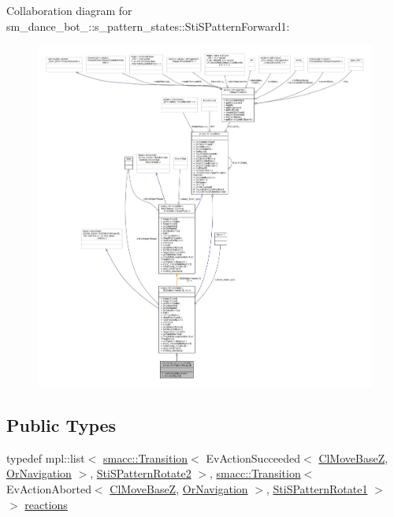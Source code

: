 Collaboration diagram for sm\+\_\+dance\+\_\+bot\+\_\+:\+:s\+\_\+pattern\+\_\+states\+:\+:Sti\+S\+Pattern\+Forward1\+:
\nopagebreak
\begin{figure}[H]
\begin{center}
\leavevmode
\includegraphics[width=350pt]{structsm__dance__bot__3_1_1s__pattern__states_1_1StiSPatternForward1__coll__graph}
\end{center}
\end{figure}
\subsection*{Public Types}
\begin{DoxyCompactItemize}
\item 
typedef mpl\+::list$<$ \hyperlink{classsmacc_1_1Transition}{smacc\+::\+Transition}$<$ Ev\+Action\+Succeeded$<$ \hyperlink{classmove__base__z__client_1_1ClMoveBaseZ}{Cl\+Move\+BaseZ}, \hyperlink{classsm__dance__bot__3_1_1OrNavigation}{Or\+Navigation} $>$, \hyperlink{structsm__dance__bot__3_1_1s__pattern__states_1_1StiSPatternRotate2}{Sti\+S\+Pattern\+Rotate2} $>$, \hyperlink{classsmacc_1_1Transition}{smacc\+::\+Transition}$<$ Ev\+Action\+Aborted$<$ \hyperlink{classmove__base__z__client_1_1ClMoveBaseZ}{Cl\+Move\+BaseZ}, \hyperlink{classsm__dance__bot__3_1_1OrNavigation}{Or\+Navigation} $>$, \hyperlink{structsm__dance__bot__3_1_1s__pattern__states_1_1StiSPatternRotate1}{Sti\+S\+Pattern\+Rotate1} $>$ $>$ \hyperlink{structsm__dance__bot__3_1_1s__pattern__states_1_1StiSPatternForward1_af5c520b1489e864cd7a3a803b7357577}{reactions}
\end{DoxyCompactItemize}
